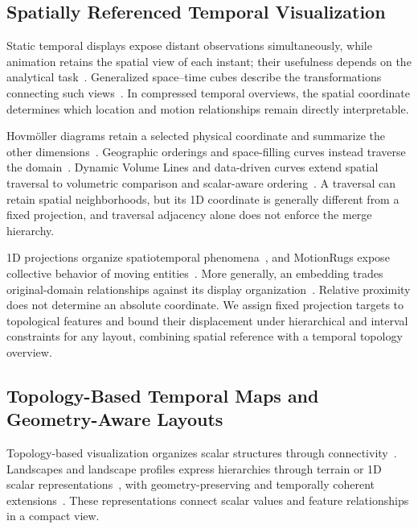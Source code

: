 \documentclass[review]{vgtc}
\begin{document}
\subsection{Spatially Referenced Temporal Visualization}
Static temporal displays expose distant observations simultaneously, while animation retains the spatial view of each instant; their usefulness depends on the analytical task~\cite{Tversky:2002:Animation,Robertson:2008:Animation}. Generalized space--time cubes describe the transformations connecting such views~\cite{Bach:2017:STC}. In compressed temporal overviews, the spatial coordinate determines which location and motion relationships remain directly interpretable.

Hovm\"oller diagrams retain a selected physical coordinate and summarize the other dimensions~\cite{Hovmoller:1949}. Geographic orderings and space-filling curves instead traverse the domain~\cite{Guo:2006:SpatialOrder,Dafner:2000:CSFC}. Dynamic Volume Lines and data-driven curves extend spatial traversal to volumetric comparison and scalar-aware ordering~\cite{Weissenboeck:2019:DVL,Zhou:2021:DSF}. A traversal can retain spatial neighborhoods, but its 1D coordinate is generally different from a fixed projection, and traversal adjacency alone does not enforce the merge hierarchy.

1D projections organize spatiotemporal phenomena~\cite{Franke:2021:1DP}, and MotionRugs expose collective behavior of moving entities~\cite{Buchmueller:2019:MR}. More generally, an embedding trades original-domain relationships against its display organization~\cite{Nonato:2019:MP}. Relative proximity does not determine an absolute coordinate. We assign fixed projection targets to topological features and bound their displacement under hierarchical and interval constraints for any layout, combining spatial reference with a temporal topology overview.

\subsection{Topology-Based Temporal Maps and Geometry-Aware Layouts}
Topology-based visualization organizes scalar structures through connectivity~\cite{Heine:2016:Survey}. Landscapes and landscape profiles express hierarchies through terrain or 1D scalar representations~\cite{Weber:2007:TL,Oesterling:2013:TLP}, with geometry-preserving and temporally coherent extensions~\cite{Beketayev:2012:GPTL,Herick:2020:TCTL}. These representations connect scalar values and feature relationships in a compact view.
\end{document}
